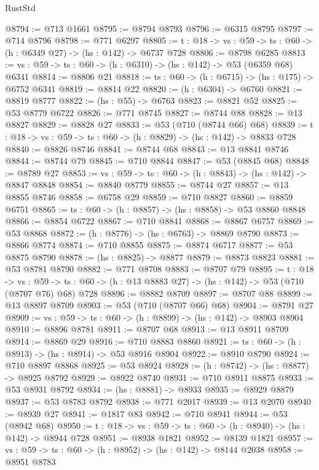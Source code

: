 \begin{lexlean}{RustStd}
\begin{coremodule}
@8794 := @713 @1661
@8795 := @8794 @8793
@8796 := @6315 @8795
@8797 := @714 @8796
@8798 := @771 @6297
@8805 := {t : @18} -> {vs : @59} -> {ts : @60} -> (h : @6349 @27) -> (hs : @142) -> @6737 @728
@8806 := @8798 @6285
@8813 := {vs : @59} -> {ts : @60} -> (h : @6310) -> (hs : @142) -> @53 (@6359 @68) @6341
@8814 := @8806 @21
@8818 := {ts : @60} -> (h : @6715) -> (hs : @175) -> @6752 @6341
@8819 := @8814 @22
@8820 := (h : @6304) -> @6760
@8821 := @8819 @8777
@8822 := (hs : @55) -> @6763
@8823 := @8821 @52
@8825 := @53 @8779 @6722
@8826 := @771 @8745
@8827 := @8744 @88
@8828 := @13 @8827
@8829 := @8828 @27
@8833 := @53 (@710 (@8744 @66) @68)
@8839 := {t : @18} -> {vs : @59} -> {ts : @60} -> (h : @8829) -> (hs : @142) -> @8833 @728
@8840 := @8826 @8746
@8841 := @8744 @68
@8843 := @13 @8841 @8746
@8844 := @8744 @79
@8845 := @710 @8844
@8847 := @53 (@8845 @68)
@8848 := @8789 @27
@8853 := {vs : @59} -> {ts : @60} -> (h : @8843) -> (hs : @142) -> @8847 @8848
@8854 := @8840 @8779
@8855 := @8744 @27
@8857 := @13 @8855 @8746
@8858 := @6758 @29
@8859 := @710 @8827
@8860 := @8859 @6751
@8865 := {ts : @60} -> (h : @8857) -> (hs : @8858) -> @53 @8860 @8848
@8866 := @8854 @6722
@8867 := @710 @8841
@8868 := @8867 @6757
@8869 := @53 @8868
@8872 := (h : @8776) -> (hs : @6763) -> @8869 @8790
@8873 := @8866 @8774
@8874 := @710 @8855
@8875 := @8874 @6717
@8877 := @53 @8875 @8790
@8878 := (hs : @8825) -> @8877
@8879 := @8873 @8823
@8881 := @53 @8781 @8790
@8882 := @771 @8708
@8883 := @8707 @79
@8895 := {t : @18} ->
  {vs : @59} -> {ts : @60} -> (h : @13 @8883 @27) -> (hs : @142) -> @53 (@710 (@8707 @76) @68) @728
@8896 := @8882 @8709
@8897 := @8707 @88
@8899 := @13 @8897 @8709
@8903 := @53 (@710 (@8707 @66) @68)
@8904 := @8791 @27
@8909 := {vs : @59} -> {ts : @60} -> (h : @8899) -> (hs : @142) -> @8903 @8904
@8910 := @8896 @8781
@8911 := @8707 @68
@8913 := @13 @8911 @8709
@8914 := @8869 @29
@8916 := @710 @8883 @8860
@8921 := {ts : @60} -> (h : @8913) -> (hs : @8914) -> @53 @8916 @8904
@8922 := @8910 @8790
@8924 := @710 @8897 @8868
@8925 := @53 @8924
@8928 := (h : @8742) -> (hs : @8877) -> @8925 @8792
@8929 := @8922 @8740
@8931 := @710 @8911 @8875
@8933 := @53 @8931 @8792
@8934 := (hs : @8881) -> @8933
@8935 := @8929 @8879
@8937 := @53 @8783 @8792
@8938 := @771 @2017
@8939 := @13 @2070
@8940 := @8939 @27
@8941 := @1817 @83
@8942 := @710 @8941
@8944 := @53 (@8942 @68)
@8950 := {t : @18} -> {vs : @59} -> {ts : @60} -> (h : @8940) -> (hs : @142) -> @8944 @728
@8951 := @8938 @1821
@8952 := @8139 @1821
@8957 := {vs : @59} -> {ts : @60} -> (h : @8952) -> (hs : @142) -> @8144 @2038
@8958 := @8951 @8783

\end{coremodule}
\end{lexlean}
